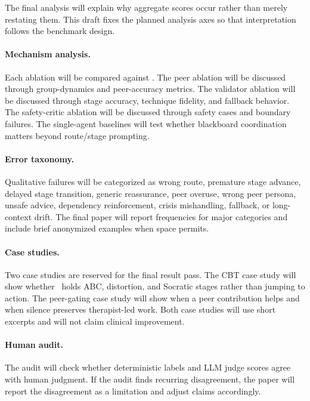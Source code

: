 The final analysis will explain why aggregate scores occur rather than merely restating them. This draft fixes the planned analysis axes so that interpretation follows the benchmark design.

\paragraph{Mechanism analysis.}
Each ablation will be compared against \tracefull. The peer ablation will be discussed through group-dynamics and peer-accuracy metrics. The validator ablation will be discussed through stage accuracy, technique fidelity, and fallback behavior. The safety-critic ablation will be discussed through safety cases and boundary failures. The single-agent baselines will test whether blackboard coordination matters beyond route/stage prompting.

\paragraph{Error taxonomy.}
Qualitative failures will be categorized as wrong route, premature stage advance, delayed stage transition, generic reassurance, peer overuse, wrong peer persona, unsafe advice, dependency reinforcement, crisis mishandling, fallback, or long-context drift. The final paper will report frequencies for major categories and include brief anonymized examples when space permits.

\paragraph{Case studies.}
Two case studies are reserved for the final result pass. The CBT case study will show whether \tracefull\ holds ABC, distortion, and Socratic stages rather than jumping to action. The peer-gating case study will show when a peer contribution helps and when silence preserves therapist-led work. Both case studies will use short excerpts and will not claim clinical improvement.

\paragraph{Human audit.}
The audit will check whether deterministic labels and LLM judge scores agree with human judgment. If the audit finds recurring disagreement, the paper will report the disagreement as a limitation and adjust claims accordingly.
